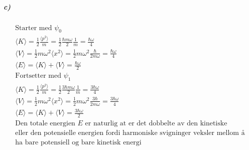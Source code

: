 \documentclass[11pt, A4paper,norsk]{article}
\begin{document}
			\subparagraph{c)}
				\begin{gather*}
\text{Starter med $\psi_0$} \\
\langle K \rangle = \frac{1}{2} \frac{\langle p^2 \rangle}{m} = \frac{1}{2} \frac{\hbar m \omega}{2} \frac{1}{m} = \frac{\hbar \omega}{4} \\
\langle V \rangle = \frac{1}{2} m \omega^2 \langle x^2 \rangle = \frac{1}{2} m \omega^2 \frac{\hbar}{2 m \omega} = \frac{\hbar \omega}{4} \\
\langle E \rangle = \langle K \rangle + \langle V \rangle = \frac{\hbar \omega}{2} \\
\text{Fortsetter med $\psi_1$} \\
\langle K \rangle = \frac{1}{2} \frac{\langle p^2 \rangle}{m} = \frac{1}{2} \frac{3 \hbar m \omega}{2} \frac{1}{m} = \frac{3 \hbar \omega}{4} \\
\langle V \rangle = \frac{1}{2} m \omega^2 \langle x^2 \rangle = \frac{1}{2} m \omega^2 \frac{3\hbar}{2 m \omega} = \frac{3 \hbar \omega}{4} \\
\langle E \rangle = \langle K \rangle + \langle V \rangle = \frac{3 \hbar \omega}{2} \\
\text{Den totale energien $E$ er naturlig at er det dobbelte av den kinetiske} \\
\text{eller den potensielle energien fordi harmoniske svigninger veksler mellom å} \\
\text{ha bare potensiell og bare kinetisk energi}
				\end{gather*}
\end{document}
